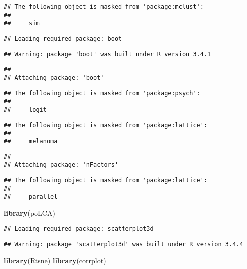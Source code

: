 \documentclass[]{article}
\newenvironment{Shaded}{\begin{snugshade}}{\end{snugshade}}
\newcommand{\KeywordTok}[1]{\textcolor[rgb]{0.13,0.29,0.53}{\textbf{#1}}}
\newcommand{\NormalTok}[1]{#1}
\begin{document}
\begin{verbatim}
## The following object is masked from 'package:mclust':
## 
##     sim
\end{verbatim}

\begin{verbatim}
## Loading required package: boot
\end{verbatim}

\begin{verbatim}
## Warning: package 'boot' was built under R version 3.4.1
\end{verbatim}

\begin{verbatim}
## 
## Attaching package: 'boot'
\end{verbatim}

\begin{verbatim}
## The following object is masked from 'package:psych':
## 
##     logit
\end{verbatim}

\begin{verbatim}
## The following object is masked from 'package:lattice':
## 
##     melanoma
\end{verbatim}

\begin{verbatim}
## 
## Attaching package: 'nFactors'
\end{verbatim}

\begin{verbatim}
## The following object is masked from 'package:lattice':
## 
##     parallel
\end{verbatim}

\begin{Shaded}
\begin{Highlighting}[]
\KeywordTok{library}\NormalTok{(poLCA)}
\end{Highlighting}
\end{Shaded}

\begin{verbatim}
## Loading required package: scatterplot3d
\end{verbatim}

\begin{verbatim}
## Warning: package 'scatterplot3d' was built under R version 3.4.4
\end{verbatim}

\begin{Shaded}
\begin{Highlighting}[]
\KeywordTok{library}\NormalTok{(Rtsne)}
\KeywordTok{library}\NormalTok{(corrplot)}
\end{Highlighting}
\end{Shaded}
\end{document}
